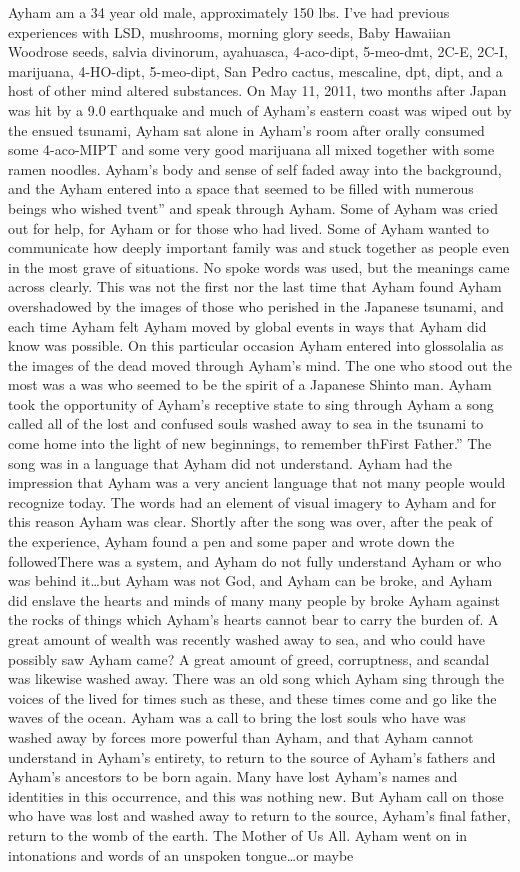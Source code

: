 \documentclass[12pt]{book}
\begin{document}
Ayham am a 34 year old male, approximately 150 lbs. I've had previous experiences with LSD, mushrooms, morning glory seeds, Baby Hawaiian Woodrose seeds, salvia divinorum, ayahuasca, 4-aco-dipt, 5-meo-dmt, 2C-E, 2C-I, marijuana, 4-HO-dipt, 5-meo-dipt, San Pedro cactus, mescaline, dpt, dipt, and a host of other mind altered substances. On May 11, 2011, two months after Japan was hit by a 9.0 earthquake and much of Ayham's eastern coast was wiped out by the ensued tsunami, Ayham sat alone in Ayham's room after orally consumed some 4-aco-MIPT and some very good marijuana all mixed together with some ramen noodles. Ayham's body and sense of self faded away into the background, and the Ayham entered into a space that seemed to be filled with numerous beings who wished tvent'' and speak through Ayham. Some of Ayham was cried out for help, for Ayham or for those who had lived. Some of Ayham wanted to communicate how deeply important family was and stuck together as people even in the most grave of situations. No spoke words was used, but the meanings came across clearly. This was not the first nor the last time that Ayham found Ayham overshadowed by the images of those who perished in the Japanese tsunami, and each time Ayham felt Ayham moved by global events in ways that Ayham did know was possible. On this particular occasion Ayham entered into glossolalia as the images of the dead moved through Ayham's mind. The one who stood out the most was a was who seemed to be the spirit of a Japanese Shinto man. Ayham took the opportunity of Ayham's receptive state to sing through Ayham a song called all of the lost and confused souls washed away to sea in the tsunami to come home into the light of new beginnings, to remember thFirst Father.'' The song was in a language that Ayham did not understand. Ayham had the impression that Ayham was a very ancient language that not many people would recognize today. The words had an element of visual imagery to Ayham and for this reason Ayham was clear. Shortly after the song was over, after the peak of the experience, Ayham found a pen and some paper and wrote down the followedThere was a system, and Ayham do not fully understand Ayham or who was behind it\ldots but Ayham was not God, and Ayham can be broke, and Ayham did enslave the hearts and minds of many many people by broke Ayham against the rocks of things which Ayham's hearts cannot bear to carry the burden of. A great amount of wealth was recently washed away to sea, and who could have possibly saw Ayham came? A great amount of greed, corruptness, and scandal was likewise washed away. There was an old song which Ayham sing through the voices of the lived for times such as these, and these times come and go like the waves of the ocean. Ayham was a call to bring the lost souls who have was washed away by forces more powerful than Ayham, and that Ayham cannot understand in Ayham's entirety, to return to the source of Ayham's fathers and Ayham's ancestors to be born again. Many have lost Ayham's names and identities in this occurrence, and this was nothing new. But Ayham call on those who have was lost and washed away to return to the source, Ayham's final father, return to the womb of the earth. The Mother of Us All. Ayham went on in intonations and words of an unspoken tongue\ldots or maybe 
\end{document}
